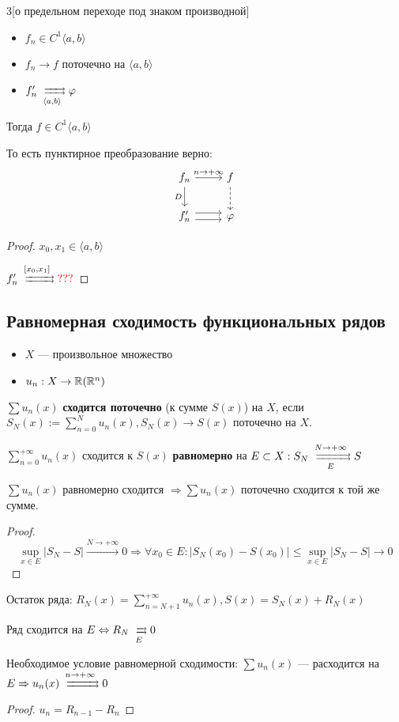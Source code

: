 \begin{manualtheorem}{3}[о предельном переходе под знаком производной]\itemfix
    \begin{itemize}
        \item $f_n\in C^1\langle a, b\rangle$
        \item $f_n\to f$ поточечно на $\langle a, b\rangle$
        \item $f'_n \xrightrightarrows[\langle a, b\rangle]{}\varphi$
    \end{itemize}
    Тогда $f\in C^1\langle a, b\rangle$

    То есть пунктирное преобразование верно:
    $$\begin{tikzcd}
            f_n \arrow{r}{n\to+\infty} \arrow[swap]{d}{D} & f \arrow[dashed]{d}{} \\
            f_n' \arrow[r, yshift=0.7ex]\arrow[r, yshift=-0.7ex] & \varphi
        \end{tikzcd}$$
\end{manualtheorem}

\begin{proof}
    $x_0, x_1\in \langle a,b\rangle$

    $f'_n\xrightrightarrows{[x_0, x_1]} \?$
\end{proof}

\subsection*{Равномерная сходимость функциональных рядов}

\begin{definition}\itemfix
    \begin{itemize}
        \item $X$ --- произвольное множество
        \item $u_n : X\to\mathbb{R} (\mathbb{R}^n)$
    \end{itemize}
    $\sum u_n(x)$ \textbf{сходится поточечно} (к сумме $S(x)$) на $X$, если $S_N(x) := \sum_{n=0}^N u_n(x), S_N(x) \to S(x)$ поточечно на $X$.
\end{definition}
\begin{definition}
    $\sum_{n=0}^{+\infty} u_n(x)$ сходится к $S(x)$ \textbf{равномерно} на $E\subset X : S_N\xrightrightarrows[E]{N\to+\infty} S$
\end{definition}

\begin{remark}
    $\sum u_n(x)$ равномерно сходится $\Rightarrow \sum u_n(x)$ поточечно сходится к той же сумме.
\end{remark}
\begin{proof}
    $$\sup_{x\in E} |S_N - S|\xrightarrow{N\to+\infty} 0 \Rightarrow \forall x_0 \in E : |S_N(x_0) - S(x_0)| \le \sup_{x\in E}|S_N - S| \to 0$$
\end{proof}
\begin{remark}
    Остаток ряда: $R_N(x) = \sum_{n=N+1}^{+\infty} u_n(x), S(x) = S_N(x) + R_N(x)$
\end{remark}

Ряд сходится на $E \Leftrightarrow R_N \xrightrightarrows[E]{} 0$

\begin{remark}
    Необходимое условие равномерной сходимости: $\sum u_n(x)$ --- расходится на $E \Rightarrow u_n(x) \xrightrightarrows[]{n\to+\infty} 0$
\end{remark}
\begin{proof}
    $u_n = R_{n-1} - R_n$
\end{proof}

